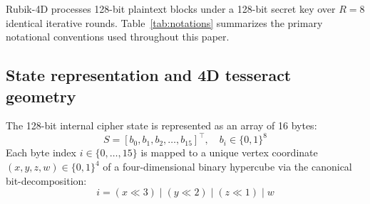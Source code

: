 \documentclass[10pt,twocolumn]{article}
\begin{document}
Rubik-4D processes 128-bit plaintext blocks under a 128-bit secret key over $R = 8$ identical iterative rounds. Table~\ref{tab:notations} summarizes the primary notational conventions used throughout this paper.

\begin{table}[htbp]
\caption{Notational conventions.}
\label{tab:notations}
\centering
\small
{}
\end{table}

\subsection{State representation and 4D tesseract geometry}
The 128-bit internal cipher state is represented as an array of 16 bytes:
\begin{equation}
    S = [b_0, b_1, b_2, \dots, b_{15}]^\top, \quad b_i \in \{0, 1\}^8
\end{equation}
Each byte index $i \in \{0, \dots, 15\}$ is mapped to a unique vertex coordinate $(x, y, z, w) \in \{0, 1\}^4$ of a four-dimensional binary hypercube via the canonical bit-decomposition:
\begin{equation}
    i = (x \ll 3) \mid (y \ll 2) \mid (z \ll 1) \mid w
\end{equation}
\end{document}
